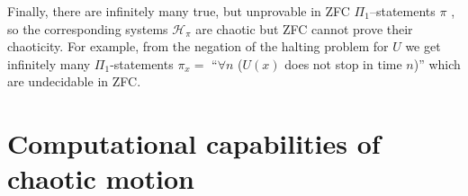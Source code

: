 \documentclass[
aip,
cha,
amssymb
]{revtex4-1}
\begin{document}
Finally, there are infinitely many
true, but unprovable in ZFC $\Pi_{1}$--statements $\pi$ \cite{cal-paun-83}, so the corresponding systems $\mathcal{H}_{\pi}$ are chaotic but ZFC cannot prove their chaoticity.  For example, from the negation of the halting problem for $U$ we get infinitely many $\Pi_{1}$-statements $\pi_{x} =$ ``$\forall n$
($U(x)$ does not stop in time $n$)'' which are undecidable in ZFC.

%
%
%
%
%

\section{Computational capabilities of chaotic motion}
\end{document}
